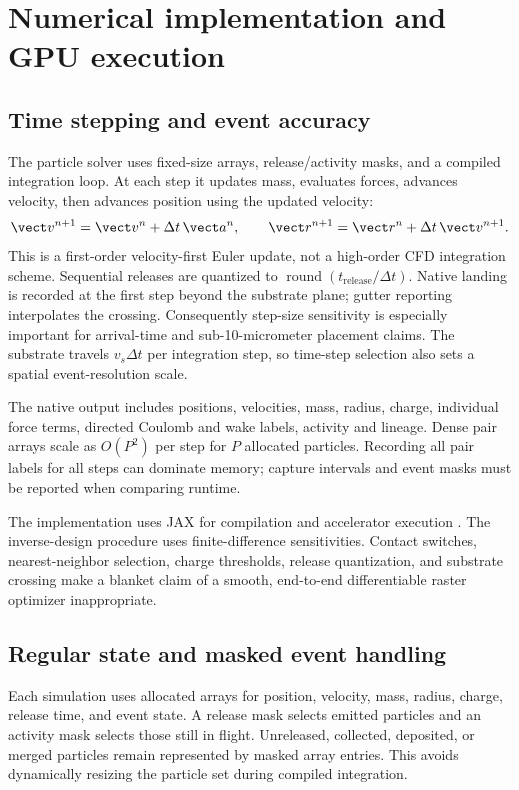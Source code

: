 \section{Numerical implementation and GPU execution}
\subsection{Time stepping and event accuracy}

The particle solver uses fixed-size arrays, release/activity masks, and a compiled integration loop. At each step it updates mass, evaluates forces, advances velocity, then advances position using the updated velocity:
\begin{equation}
 \vect v^{n+1}=\vect v^n+\Delta t\,\vect a^n,\qquad
 \vect r^{n+1}=\vect r^n+\Delta t\,\vect v^{n+1}.
\end{equation}
This is a first-order velocity-first Euler update, not a high-order CFD integration scheme. Sequential releases are quantized to $\operatorname{round}(t_{\mathrm{release}}/\Delta t)$. Native landing is recorded at the first step beyond the substrate plane; gutter reporting interpolates the crossing. Consequently step-size sensitivity is especially important for arrival-time and sub-10-micrometer placement claims. The substrate travels $v_s\Delta t$ per integration step, so time-step selection also sets a spatial event-resolution scale.

The native output includes positions, velocities, mass, radius, charge, individual force terms, directed Coulomb and wake labels, activity and lineage. Dense pair arrays scale as $O(P^2)$ per step for $P$ allocated particles. Recording all pair labels for all steps can dominate memory; capture intervals and event masks must be reported when comparing runtime.

The implementation uses JAX for compilation and accelerator execution \citep{jax,jaxjit}. The inverse-design procedure uses finite-difference sensitivities. Contact switches, nearest-neighbor selection, charge thresholds, release quantization, and substrate crossing make a blanket claim of a smooth, end-to-end differentiable raster optimizer inappropriate.


\subsection{Regular state and masked event handling}
Each simulation uses allocated arrays for position, velocity, mass, radius, charge, release time, and event state. A release mask selects emitted particles and an activity mask selects those still in flight. Unreleased, collected, deposited, or merged particles remain represented by masked array entries. This avoids dynamically resizing the particle set during compiled integration.

